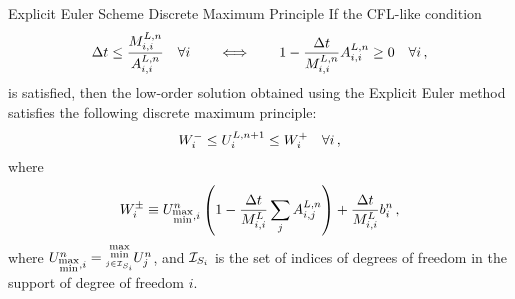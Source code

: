 \begin{theorem}{Explicit Euler Scheme Discrete
  Maximum Principle}
If the CFL-like condition
\begin{equation}\label{eq:explicit_cfl}
  \Delta t \leq \frac{M_{i,i}^{L,n}}
    {A_{i,i}^{L,n}}
  \quad\forall i
  \qquad\Longleftrightarrow\qquad
  1 - \frac{\Delta t}{M_{i,i}^{L,n}}
    A_{i,i}^{L,n}
    \geq 0\quad\forall i \,,
\end{equation}
is satisfied, then the low-order solution obtained using the Explicit Euler
method satisfies the following discrete maximum principle:
\begin{equation}\label{eq:explicit_dmp}
   W_i^-\leq U_i^{L,n+1}\leq W_i^+\quad\forall i
   \,,
\end{equation}
where
\begin{equation}\label{eq:explicit_bounds}
   W_i^\pm\equiv U_{\substack{\max\\\min},i}^n
     \left(1-\frac{\Delta t}{M_{i,i}^L}
       \sum\limits_jA^{L,n}_{i,j}\right)
     + \frac{\Delta t}{M_{i,i}^L}b_i^n \,,
\end{equation}
where $\solutionletter_{\substack{\max\\\min},i}^\timeindex =
\substack{\max\\\min\limits_{j\in\indicescell[\support_i]}}\solutionletter_j^\timeindex$,
and $\indicescell[\support_i]$ is the set of indices of degrees of freedom in the
support of degree of freedom $i$.
\end{theorem}


